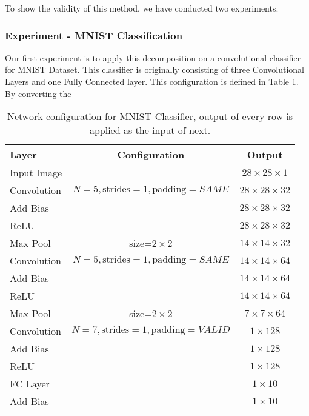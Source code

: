 To show the validity of this method, we have conducted two experiments. 
\subsubsection{Experiment - MNIST Classification}
Our first experiment is to apply this decomposition on a convolutional classifier for MNIST Dataset. This classifier is originally consisting of three Convolutional Layers and one Fully Connected layer. This configuration is defined in Table \ref{tab:nxn-mnist-classifier}. By converting the 
\begin{table}
\centering
\begin{tabular}{l | c | c}
Layer & Configuration & Output\\
\hline
Input Image & & $28 \times 28 \times 1$ \\
\hline
Convolution & \small $N=5, \text{strides}=1, \text{padding}=SAME$ & $28 \times 28 \times 32$ \\
Add Bias & & $28 \times 28 \times 32$ \\
ReLU & & $28 \times 28 \times 32$ \\
Max Pool & size=$ 2 \times 2$ & $14 \times 14 \times 32$ \\
\hline
Convolution & \small $N=5, \text{strides}=1, \text{padding}=SAME$ & $14 \times 14 \times 64$ \\
Add Bias & & $14 \times 14 \times 64$ \\
ReLU & & $14 \times 14 \times 64$ \\
Max Pool & size=$ 2 \times 2$ & $7 \times 7 \times 64$ \\
\hline
Convolution & \small $N=7, \text{strides}=1, \text{padding}=VALID$ & $1 \times 128$ \\
Add Bias & & $ 1 \times 128$ \\
ReLU & & $ 1 \times 128$ \\
\hline
FC Layer &  & $1 \times 10$ \\
Add Bias & & $1 \times 10$ 
\end{tabular}
\caption{Network configuration for MNIST Classifier, output of every row is applied as the input of next.}
\label{tab:nxn-mnist-classifier}
\end{table}
































